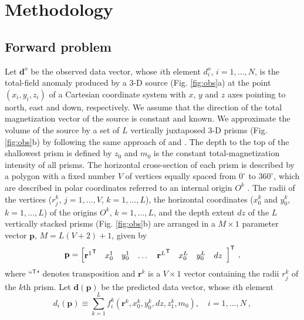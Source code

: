\section{Methodology}\label{sec:metodo}

\subsection{Forward problem}

Let $\mathbf{d}^{o}$ be the observed data vector, whose $i$th element $d^{o}_{i}$, $i = 1, \dots, N$, is the total-field 
anomaly produced by a 3-D source (Fig. \ref{fig:obs}a) at the point $(x_{i}, y_{i}, z_{i})$ of a Cartesian coordinate 
system with $x$, $y$ and $z$ axes pointing to north, east and down, respectively. We assume that the direction of the 
total magnetization vector of the source is constant and known. 
We approximate the volume of the source by a set of $L$ vertically juxtaposed 3-D prisms 
(Fig. \ref{fig:obs}b) by following the same approach of \citet{oliveirajr-etal2011} and \citet{oliveirajr-barbosa2013}. 
The depth to the top of the shallowest prism is defined by $z_{0}$ and $m_{0}$ is the constant total-magnetization 
intensity of all prisms. 
The horizontal cross-section of each prism is described by a polygon with a fixed number 
$V$ of vertices equally spaced from $0^{\circ}$ to $360^{\circ}$, which are described in polar coordinates 
referred to an internal origin $O^{k}$ . 
The radii of the vertices ($r^{k}_{j}$, $j=1,\dots , V$, $k=1,\dots ,L$), the horizontal coordinates ($x_{0}^{k}$ and $y_{0}^{k}$, $k=1,\dots ,L$) 
of the origins $O^{k}$, $k=1,\dots ,L$, and the depth extent $dz$ of the $L$ vertically stacked prisms (Fig. \ref{fig:obs}b) are arranged in a 
$M \times 1$ parameter vector $\mathbf{p}$, $M = L (V + 2) + 1$, given by
\begin{equation}
\mathbf{p} = \left[ \begin{array}{@{}*{12}{c}@{}}
{\mathbf{r}^{1}}^{\mathsf{T}} & x_{0}^{1} & y_{0}^{1} & \dots & {\mathbf{r}^{L}}^{\mathsf{T}} & x_{0}^{L} & y_{0}^{L} & dz \\
\end{array} \right]^{\mathsf{T}} \: ,
\label{eq:p-vector}
\end{equation}
where ``$^{\mathsf{T}}$" denotes transposition and $\mathbf{r}^{k}$ is a $V \times 1$ vector containing the radii $r^{k}_{j}$ 
of the $k$th prism.
Let $\mathbf{d} (\mathbf{p})$ be the predicted data vector, whose $i$th element 
\begin{equation}
d_{i} (\mathbf{p}) \equiv \sum\limits_{k=1}^{L} f_{i}^{k}(\mathbf{r}^{k}, x_{0}^{k}, y_{0}^{k}, dz, z_{1}^{k}, m_{0}), \quad i = 1, \dots, N \: ,
\label{eq:predicted-data-i}
\end{equation}

